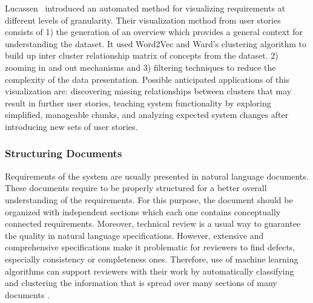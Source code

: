 	 Lucassen\etal~\cite{Lucassen:2016} introduced an automated method for visualizing
requirements at different levels of granularity. Their visualization method from
user stories consists of 1) the generation of an overview which provides a
general context for understanding the dataset. It used Word2Vec and Ward’s clustering algorithm to build up inter cluster relationship matrix of concepts from the dataset. 
2) zooming in and out mechanisms and 3) filtering techniques to reduce the
complexity of the data presentation. Possible anticipated applications of this
visualization are: discovering missing relationships between clusters that may
result in further user stories, teaching system functionality by exploring
simplified, manageable chunks, and analyzing expected system changes after
introducing new sets of user stories.

\subsubsection{Structuring Documents} 

Requirements of the system are usually presented in natural language documents. These documents require to be properly structured for a better overall understanding of the requirements. For this purpose, the document should be organized with independent sections which each one contains conceptually connected requirements\cite{Ferrari:2013}. Moreover, technical review is a usual way to guarantee the quality in natural language specifications. However, extensive and comprehensive specifications make it problematic for reviewers to find defects, especially consistency or completeness ones. Therefore, use of machine learning algorithms can support reviewers with their work by automatically classifying and clustering the information that is spread over many sections of many documents \cite{Ott:2013}.

